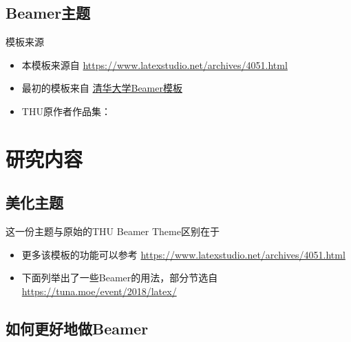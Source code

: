 \documentclass{beamer}  %
\begin{document}
\subsection{Beamer主题}

\begin{frame}{模板来源}
    \begin{itemize}
        \item 本模板来源自 \newline \url{https://www.latexstudio.net/archives/4051.html}
        \item 最初的模板来自 \href{http://far.tooold.cn/post/latex/beamertsinghua}{清华大学Beamer模板}
        \item THU原作者作品集：\href{https://github.com/Trinkle23897/oi_slides}{\color{purple}{GitHub 仓库}}
    \end{itemize}
\end{frame}


\section{研究内容}

\subsection{美化主题}

\begin{frame}{这一份主题与原始的THU Beamer Theme区别在于}
    \begin{itemize}
        \item 更多该模板的功能可以参考 \url{https://www.latexstudio.net/archives/4051.html}
        \item 下面列举出了一些Beamer的用法，部分节选自 \url{https://tuna.moe/event/2018/latex/}
    \end{itemize}
\end{frame}

\subsection{如何更好地做Beamer}
\end{document}
